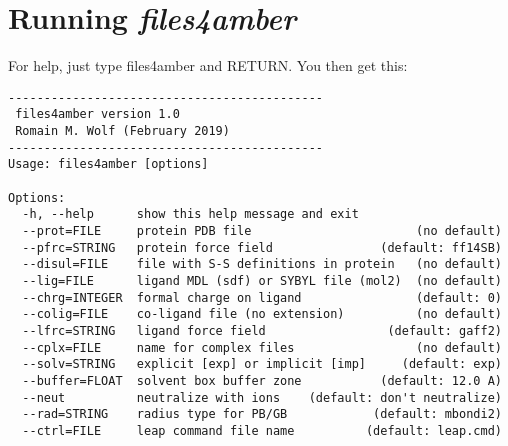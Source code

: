 \documentclass[10pt,landscape,twocolumn]{article}
\begin{document}
\newpage
\section{Running \textsl{files4amber}}

For help, just type files4amber and RETURN. You then get this:

\begin{verbatim}
--------------------------------------------
 files4amber version 1.0
 Romain M. Wolf (February 2019)
--------------------------------------------
Usage: files4amber [options]

Options:
  -h, --help      show this help message and exit
  --prot=FILE     protein PDB file                       (no default)
  --pfrc=STRING   protein force field               (default: ff14SB)
  --disul=FILE    file with S-S definitions in protein   (no default)
  --lig=FILE      ligand MDL (sdf) or SYBYL file (mol2)  (no default)
  --chrg=INTEGER  formal charge on ligand                (default: 0)
  --colig=FILE    co-ligand file (no extension)          (no default)
  --lfrc=STRING   ligand force field                 (default: gaff2)
  --cplx=FILE     name for complex files                 (no default)
  --solv=STRING   explicit [exp] or implicit [imp]     (default: exp)
  --buffer=FLOAT  solvent box buffer zone           (default: 12.0 A)
  --neut          neutralize with ions    (default: don't neutralize)
  --rad=STRING    radius type for PB/GB            (default: mbondi2)
  --ctrl=FILE     leap command file name          (default: leap.cmd)\end{verbatim}
\end{document}
